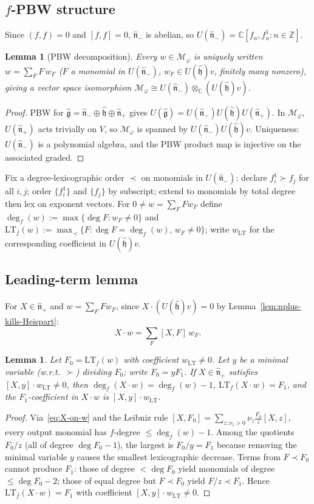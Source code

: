 \documentclass{amsart}
\newcommand{\Cx}{\mathbb{C}}
\newcommand{\Z}{\mathbb{Z}}
\newcommand{\g}{\mathfrak{g}}
\newcommand{\h}{\mathfrak{h}}
\newcommand{\wh}[1]{\widehat{#1}}
\newcommand{\whg}{\wh{\g}}
\newcommand{\whh}{\wh{\h}}
\newtheorem{lemma}[theorem]{Lemma}
\theoremstyle{definition}
\theoremstyle{remark}
\numberwithin{equation}{section}
\begin{document}
\subsection{$f$-PBW structure}
Since $(f,f)=0$ and $[f,f]=0$, $\wh{\mathfrak n}_-$ is abelian, so
$U(\wh{\mathfrak n}_-)=\Cx[f_n,f_n^1:n\in\Z]$.
\begin{lemma}[PBW decomposition]\label{lem:pbw-Mphi}
Every $w\in\mathcal M_\varphi$ is uniquely written
$w=\sum_F F\,w_F$ ($F$ a monomial in $U(\wh{\mathfrak n}_-)$,
$w_F\in U(\whh)v$, finitely many nonzero), giving a vector space
isomorphism $\mathcal M_\varphi\cong U(\wh{\mathfrak n}_-)\otimes_\Cx(U(\whh)v)$.
\end{lemma}
\begin{proof}
PBW for $\whg=\wh{\mathfrak n}_-\oplus\whh\oplus\wh{\mathfrak n}_+$ gives
$U(\whg)=U(\wh{\mathfrak n}_-)U(\whh)U(\wh{\mathfrak n}_+)$.  In
$\mathcal M_\varphi$, $U(\wh{\mathfrak n}_+)$ acts trivially on $V$,
so $\mathcal M_\varphi$ is spanned by $U(\wh{\mathfrak n}_-)U(\whh)v$.
Uniqueness: $U(\wh{\mathfrak n}_-)$ is a polynomial algebra, and the PBW
product map is injective on the associated graded.
\end{proof}
Fix a degree-lexicographic order $\prec$ on monomials in
$U(\wh{\mathfrak n}_-)$: declare $f_i^1\succ f_j$ for all $i,j$; order
$\{f_i^1\}$ and $\{f_j\}$ by subscript; extend to monomials by total
degree then lex on exponent vectors.
For $0\neq w=\sum_FFw_F$ define
$\deg_f(w):=\max\{\deg F:w_F\neq0\}$ and
$\mathrm{LT}_f(w):=\max_\prec\{F:\deg F=\deg_f(w),\,w_F\neq0\}$;
write $w_{\mathrm{LT}}$ for the corresponding coefficient in $U(\whh)v$.
\subsection{Leading-term lemma}
For $X\in\wh{\mathfrak n}_+$ and $w=\sum_FFw_F$, since
$X\cdot(U(\whh)v)=0$ by Lemma~\ref{lem:nplus-kills-Heispart}:
\begin{equation}\label{eq:X-on-w}
X\cdot w=\sum_F[X,F]\,w_F.
\end{equation}
\begin{lemma}\label{lem:lead-comm}
Let $F_0=\mathrm{LT}_f(w)$ with coefficient $w_{\mathrm{LT}}\neq0$.
Let $y$ be a minimal variable (w.r.t.\ $\succ$) dividing $F_0$;
write $F_0=yF_1$.  If $X\in\wh{\mathfrak n}_+$ satisfies
$[X,y]\cdot w_{\mathrm{LT}}\neq0$, then
$\deg_f(X\cdot w)=\deg_f(w)-1$, $\mathrm{LT}_f(X\cdot w)=F_1$,
and the $F_1$-coefficient in $X\cdot w$ is $[X,y]\cdot w_{\mathrm{LT}}$.
\end{lemma}
\begin{proof}
Via~\eqref{eq:X-on-w} and the Leibniz rule
$[X,F_0]=\sum_{z:\nu_z>0}\nu_z\frac{F_0}{z}[X,z]$,
every output monomial has $f$-degree $\le\deg_f(w)-1$.
Among the quotients $F_0/z$ (all of degree $\deg F_0-1$), the largest
is $F_0/y=F_1$ because removing the minimal variable $y$ causes the
smallest lexicographic decrease.  Terms from $F\prec F_0$ cannot produce
$F_1$: those of degree $<\deg F_0$ yield monomials of degree
$\le\deg F_0-2$; those of equal degree but $F\prec F_0$ yield
$F/z\prec F_1$.  Hence $\mathrm{LT}_f(X\cdot w)=F_1$ with coefficient
$[X,y]\cdot w_{\mathrm{LT}}\neq0$.
\end{proof}
\end{document}
